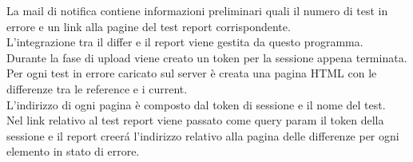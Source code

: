         La mail di notifica contiene informazioni preliminari quali il numero di test in errore e un link alla pagine del test report corrispondente.\\

        L'integrazione tra il differ e il report viene gestita da questo programma.\\
        Durante la fase di upload viene creato un token per la sessione appena terminata.\\
        Per ogni test in errore caricato sul server è creata una pagina HTML con le differenze tra le reference e i current.\\
        
        L'indirizzo di ogni pagina è composto dal token di sessione e il nome del test.\\
        Nel link relativo al test report viene passato come query param il token della sessione e il report creer\'a l'indirizzo relativo alla pagina delle differenze per ogni elemento in stato di errore.\\
